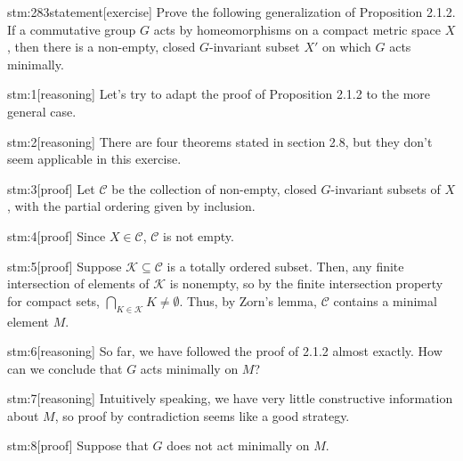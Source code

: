 \documentclass{article}
\begin{document}

\begin{stm}{stm:283statement}[exercise]
Prove the following generalization of Proposition 2.1.2. If a commutative group $G$ acts by homeomorphisms on a compact metric space $X$, then there is a non-empty, closed $G$-invariant subset $X'$ on which $G$ acts minimally.
\end{stm}


\begin{stm}{stm:1}[reasoning]
Let's try to adapt the proof of Proposition 2.1.2 to the more general case.
\end{stm}

\begin{stm}{stm:2}[reasoning]
There are four theorems stated in section 2.8, but they don't seem applicable in this exercise.
\end{stm}

\begin{stm}{stm:3}[proof]
Let $\mathcal{C}$ be the collection of non-empty, closed $G$-invariant subsets of $X$, with the partial ordering given by inclusion.
\end{stm}

\begin{stm}{stm:4}[proof]
Since $X \in \mathcal{C}$, $\mathcal{C}$ is not empty.
\end{stm}

\begin{stm}{stm:5}[proof]
Suppose $\mathcal{K} \subseteq \mathcal{C}$ is a totally ordered subset. Then, any finite intersection of elements of $\mathcal{K}$ is nonempty, so by the finite intersection property for compact sets, $\bigcap_{K \in \mathcal{K}} K \ne \emptyset$. Thus, by Zorn's lemma, $\mathcal{C}$ contains a minimal element $M$.
\end{stm}

\begin{stm}{stm:6}[reasoning]
So far, we have followed the proof of 2.1.2 almost exactly. How can we conclude that $G$ acts minimally on $M$?
\end{stm}

\begin{stm}{stm:7}[reasoning]
Intuitively speaking, we have very little constructive information about $M$, so proof by contradiction seems like a good strategy.
\end{stm}

\begin{stm}{stm:8}[proof]
Suppose that $G$ does not act minimally on $M$.
\end{stm}
\end{document}
